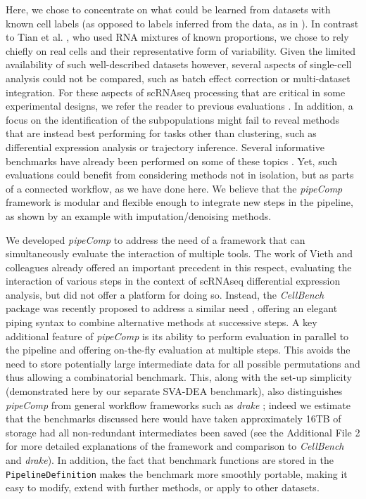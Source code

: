 \documentclass{bmcart}
\begin{document}
Here, we chose to concentrate on what could be learned from datasets with known cell labels (as opposed to labels inferred from the data, as in \cite{MereuCellAtlas2019}). In contrast to Tian et al. \cite{tianMixology2018}, who used RNA mixtures of known proportions, we chose to rely chiefly on real cells and their representative form of variability. Given the limited availability of such well-described datasets however, several aspects of single-cell analysis could not be compared, such as batch effect correction or multi-dataset integration. For these aspects of scRNAseq processing that are critical in some experimental designs, we refer the reader to previous evaluations \cite{TranBatch2020, StuartIntegration2019}. In addition, a focus on the identification of the subpopulations might fail to reveal methods that are instead best performing for tasks other than clustering, such as differential expression analysis or trajectory inference. Several informative benchmarks have already been performed on some of these topics \cite{CrowellMuscat2019, DalMolinDE2017, JaakkolaDE2017, SaelensTraject2019, SonesonDE2018, WangDE2019}. Yet, such evaluations could benefit from considering methods not in isolation, but as parts of a connected workflow, as we have done here. We believe that the \textit{pipeComp} framework is modular and flexible enough to integrate new steps in the pipeline, as shown by an example with imputation/denoising methods.

We developed \textit{pipeComp} to address the need of a framework that can simultaneously evaluate the interaction of multiple tools. The work of Vieth and colleagues\cite{viethSystematic2019} already offered an important precedent in this respect, evaluating the interaction of various steps in the context of scRNAseq differential expression analysis, but did not offer a platform for doing so. Instead, the \textit{CellBench} package was recently proposed to address a similar need \cite{suCellbench}, offering an elegant piping syntax to combine alternative methods at successive steps. A key additional feature of \textit{pipeComp} is its ability to perform evaluation in parallel to the pipeline and offering on-the-fly evaluation at multiple steps. This avoids the need to store potentially large intermediate data for all possible permutations and thus allowing a combinatorial benchmark. This, along with the set-up simplicity (demonstrated here by our separate SVA-DEA benchmark), also distinguishes \textit{pipeComp} from general workflow frameworks such as \textit{drake} \citep{landauDrakePackage2018}; indeed we estimate that the benchmarks discussed here would have taken approximately 16TB of storage had all non-redundant intermediates been saved (see the {\color{red} Additional File 2} for more detailed explanations of the framework and comparison to \textit{CellBench} and \textit{drake}). In addition, the fact that benchmark functions are stored in the \texttt{PipelineDefinition} makes the benchmark more smoothly portable, making it easy to modify, extend with further methods, or apply to other datasets.
\end{document}
